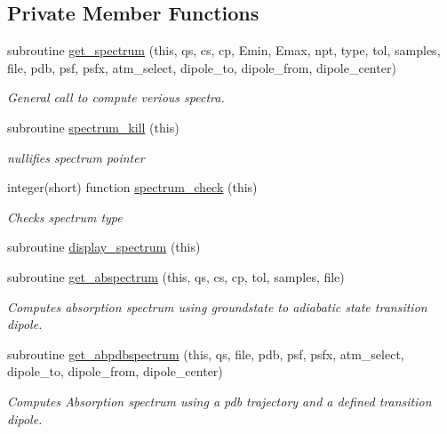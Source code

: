 \subsection*{Private Member Functions}
\begin{DoxyCompactItemize}
\item 
subroutine \hyperlink{classspectrometer__class_a068171434fa75613677e6357291df1fe}{get\-\_\-spectrum} (this, qs, cs, cp, Emin, Emax, npt, type, tol, samples, file, pdb, psf, psfx, atm\-\_\-select, dipole\-\_\-to, dipole\-\_\-from, dipole\-\_\-center)
\begin{DoxyCompactList}\small\item\em General call to compute verious spectra. \end{DoxyCompactList}\item 
subroutine \hyperlink{classspectrometer__class_aabaa46560b8ea49cd16b6c11a8a2fe65}{spectrum\-\_\-kill} (this)
\begin{DoxyCompactList}\small\item\em nullifies spectrum pointer \end{DoxyCompactList}\item 
integer(short) function \hyperlink{classspectrometer__class_a94382eb7e533e6a74dd79200ca0e38ed}{spectrum\-\_\-check} (this)
\begin{DoxyCompactList}\small\item\em Checks spectrum type \end{DoxyCompactList}\item 
subroutine \hyperlink{classspectrometer__class_a3f9fc6096d581c5a7094174b47898d10}{display\-\_\-spectrum} (this)
\item 
subroutine \hyperlink{classspectrometer__class_ad2c4936524c8702e1c4e53a54a043f31}{get\-\_\-abspectrum} (this, qs, cs, cp, tol, samples, file)
\begin{DoxyCompactList}\small\item\em Computes absorption spectrum using groundstate to adiabatic state transition dipole. \end{DoxyCompactList}\item 
subroutine \hyperlink{classspectrometer__class_af1fc802879075c7e5e42ef4baac69445}{get\-\_\-abpdbspectrum} (this, qs, file, pdb, psf, psfx, atm\-\_\-select, dipole\-\_\-to, dipole\-\_\-from, dipole\-\_\-center)
\begin{DoxyCompactList}\small\item\em Computes Absorption spectrum using a pdb trajectory and a defined transition dipole. \end{DoxyCompactList}\end{DoxyCompactItemize}
